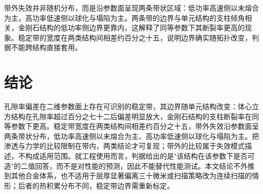 \documentclass[11pt]{article}
\begin{document}
带外失效并非随机分布，而是沿参数面呈现两条带状区域：低功率高速侧以未熔合为主，高功率低速侧以球化与塌陷为主。两条带的边界与单元结构的支柱倾角相关，金刚石结构的低功率侧边界更靠内，这解释了同等参数下其断裂率更高的现象。稳定带的宽度在两类结构间相差约百分之十五，说明边界确实随拓扑改变，判据不能跨结构直接套用。

\section{结论}
孔隙率偏差在二维参数面上存在可识别的稳定带，其边界随单元结构改变：体心立方结构在孔隙率超过百分之七十二后偏差明显放大，金刚石结构的支柱断裂率在同等参数下更高。稳定带宽度在两类结构间相差约百分之十五，带外失效沿参数面呈两条带状分布，低功率高速侧以未熔合为主、高功率低速侧以球化与塌陷为主。把渗透与力学的比较限制在带内，两类结论才可复现；带外的比较属于失效模式描述，不构成适用范围。就工程使用而言，判据给出的是"该结构在该参数下是否可造"的二值回答，而不是对性能的预测，因此不能替代性能测试。本文结论不外推到其他合金体系，也不适用于层厚显著偏离三十微米或扫描策略改为连续扫描的情形；后者的热积累分布不同，稳定带边界需重新标定。



\end{document}
